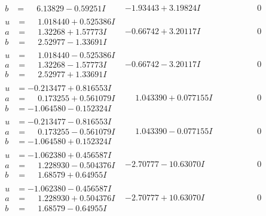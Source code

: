 \documentclass[1p]{elsarticle_modified}
\theoremstyle{definition}
\begin{document}
$$\begin{array}{c|c|c}
\begin{aligned}
b &= \phantom{-}6.13829 - 0.59251 I\end{aligned}
 & -1.93443 + 3.19824 I & \phantom{-0.000000 } 0 \\ \hline\begin{aligned}
u &= \phantom{-}1.018440 + 0.525386 I \\
a &= \phantom{-}1.32268 + 1.57773 I \\
b &= \phantom{-}2.52977 - 1.33691 I\end{aligned}
 & -0.66742 + 3.20117 I & \phantom{-0.000000 } 0 \\ \hline\begin{aligned}
u &= \phantom{-}1.018440 - 0.525386 I \\
a &= \phantom{-}1.32268 - 1.57773 I \\
b &= \phantom{-}2.52977 + 1.33691 I\end{aligned}
 & -0.66742 - 3.20117 I & \phantom{-0.000000 } 0 \\ \hline\begin{aligned}
u &= -0.213477 + 0.816553 I \\
a &= \phantom{-}0.173255 + 0.561079 I \\
b &= -1.064580 - 0.152324 I\end{aligned}
 & \phantom{-}1.043390 + 0.077155 I & \phantom{-0.000000 } 0 \\ \hline\begin{aligned}
u &= -0.213477 - 0.816553 I \\
a &= \phantom{-}0.173255 - 0.561079 I \\
b &= -1.064580 + 0.152324 I\end{aligned}
 & \phantom{-}1.043390 - 0.077155 I & \phantom{-0.000000 } 0 \\ \hline\begin{aligned}
u &= -1.062380 + 0.456587 I \\
a &= \phantom{-}1.228930 - 0.504376 I \\
b &= \phantom{-}1.68579 + 0.64955 I\end{aligned}
 & -2.70777 - 10.63070 I & \phantom{-0.000000 } 0 \\ \hline\begin{aligned}
u &= -1.062380 - 0.456587 I \\
a &= \phantom{-}1.228930 + 0.504376 I \\
b &= \phantom{-}1.68579 - 0.64955 I\end{aligned}
 & -2.70777 + 10.63070 I & \phantom{-0.000000 } 0 \\ \hline\begin{aligned}

\end{aligned}
\end{array}$$
\end{document}

